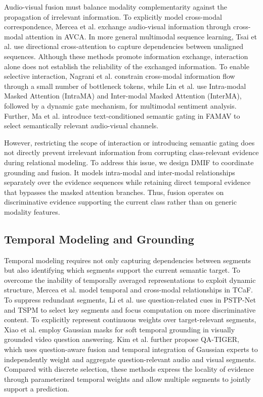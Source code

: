 Audio-visual fusion must balance modality complementarity against the propagation of irrelevant information. To explicitly model cross-modal correspondence, Mercea et al. \cite{mercea2022avca} exchange audio-visual information through cross-modal attention in AVCA. In more general multimodal sequence learning, Tsai et al. \cite{tsai2019mult} use directional cross-attention to capture dependencies between unaligned sequences. Although these methods promote information exchange, interaction alone does not establish the reliability of the exchanged information. To enable selective interaction, Nagrani et al. \cite{nagrani2021bottlenecks} constrain cross-modal information flow through a small number of bottleneck tokens, while Lin et al. \cite{lin2025semiinn} use Intra-modal Masked Attention (IntraMA) and Inter-modal Masked Attention (InterMA), followed by a dynamic gate mechanism, for multimodal sentiment analysis. Further, Ma et al. \cite{ma2026famav} introduce text-conditioned semantic gating in FAMAV to select semantically relevant audio-visual channels.

However, restricting the scope of interaction or introducing semantic gating does not directly prevent irrelevant information from corrupting class-relevant evidence during relational modeling. To address this issue, we design DMIF to coordinate grounding and fusion. It models intra-modal and inter-modal relationships separately over the evidence sequences while retaining direct temporal evidence that bypasses the masked attention branches. Thus, fusion operates on discriminative evidence supporting the current class rather than on generic modality features.

\subsection{Temporal Modeling and Grounding}\label{sec:temporal-modeling-and-grounding}

Temporal modeling requires not only capturing dependencies between segments but also identifying which segments support the current semantic target. To overcome the inability of temporally averaged representations to exploit dynamic structure, Mercea et al. \cite{mercea2022tcaf} model temporal and cross-modal relationships in TCaF. To suppress redundant segments, Li et al. use question-related cues in PSTP-Net \cite{li2023pstp} and TSPM \cite{li2024tspm} to select key segments and focus computation on more discriminative content. To explicitly represent continuous weights over target-relevant segments, Xiao et al. \cite{xiao2024trust} employ Gaussian masks for soft temporal grounding in visually grounded video question answering. Kim et al. \cite{kim2025qatiger} further propose QA-TIGER, which uses question-aware fusion and temporal integration of Gaussian experts to independently weight and aggregate question-relevant audio and visual segments. Compared with discrete selection, these methods express the locality of evidence through parameterized temporal weights and allow multiple segments to jointly support a prediction.

